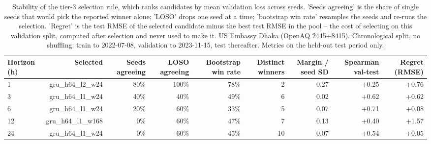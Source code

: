 \begin{table}[htbp]
\caption{Stability of the tier-3 selection rule, which ranks candidates by mean validation loss across seeds. 'Seeds agreeing' is the share of single seeds that would pick the reported winner alone; 'LOSO' drops one seed at a time; 'bootstrap win rate' resamples the seeds and re-runs the selection. 'Regret' is the test RMSE of the selected candidate minus the best test RMSE in the pool -- the cost of selecting on this validation split, computed after selection and never used to make it. US Embassy Dhaka (OpenAQ 2445+8415). Chronological split, no shuffling: train to 2022-07-08, validation to 2023-11-15, test thereafter. Metrics on the held-out test period only.}
\label{tab:selection_stability}
\begin{tabular}{lrrrrrrrr}
\toprule
Horizon (h) & Selected & Seeds agreeing & LOSO agreeing & Bootstrap win rate & Distinct winners & Margin / seed SD & Spearman val-test & Regret (RMSE) \\
\midrule
1 & gru\_h64\_l2\_w24 & 80\% & 100\% & 78\% & 2 & 0.27 & +0.25 & +0.76 \\
3 & gru\_h64\_l1\_w24 & 40\% & 40\% & 49\% & 6 & 0.02 & +0.62 & +0.62 \\
6 & gru\_h64\_l1\_w24 & 20\% & 60\% & 33\% & 5 & 0.07 & +0.71 & +0.08 \\
12 & gru\_h64\_l1\_w168 & 0\% & 60\% & 47\% & 7 & 0.13 & +0.40 & +1.57 \\
24 & gru\_h64\_l1\_w24 & 0\% & 60\% & 45\% & 10 & 0.07 & +0.54 & +0.05 \\
\bottomrule
\end{tabular}
\end{table}
